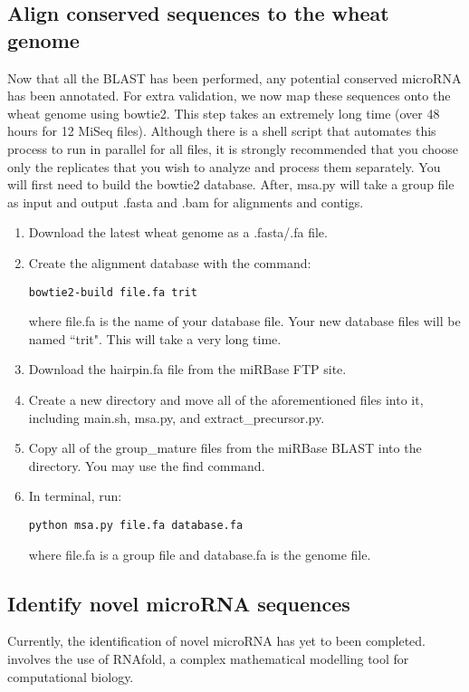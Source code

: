 \documentclass[12pt,titlepage]{article}
\begin{document}
\subsection{Align conserved sequences to the wheat genome}
Now that all the BLAST has been performed, any potential conserved microRNA has been annotated. For extra validation, we now map these sequences onto the wheat genome using bowtie2. This step takes an extremely long time (over 48 hours for 12 MiSeq files). Although there is a shell script that automates this process to run in parallel for all files, it is strongly recommended that you choose only the replicates that you wish to analyze and process them separately. You will first need to build the bowtie2 database. After, msa.py will take a group file as input and output .fasta and .bam for alignments and contigs.
\begin{enumerate}
\item Download the latest wheat genome as a .fasta/.fa file.
\item Create the alignment database with the command:
\begin{tcolorbox}
\begin{lstlisting}
bowtie2-build file.fa trit 
\end{lstlisting}
\end{tcolorbox}where file.fa is the name of your database file. Your new database files will be named ``trit". This will take a very long time.
\item Download the hairpin.fa file from the miRBase FTP site.
\item Create a new directory and move all of the aforementioned files into it, including main.sh, msa.py, and extract\_precursor.py.
\item Copy all of the group\_mature files from the miRBase BLAST into the directory. You may use the find command.
\item In terminal, run:
\begin{tcolorbox}
\begin{lstlisting}
python msa.py file.fa database.fa
\end{lstlisting}
\end{tcolorbox}where file.fa is a group file and database.fa is the genome file.
\end{enumerate}

\subsection{Identify novel microRNA sequences}
Currently, the identification of novel microRNA has yet to been completed. involves the use of RNAfold, a complex mathematical modelling tool for computational biology.\\ 
\end{document}
